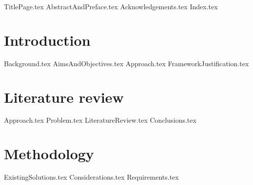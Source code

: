 \documentclass{article} %
\begin{document}

{TitlePage.tex}
{AbstractAndPreface.tex}
{Acknowledgements.tex}
{Index.tex}

\newpage
\section{Introduction}
{Background.tex}
{AimsAndObjectives.tex}
{Approach.tex}
{FrameworkJustification.tex}

\newpage
\section{Literature review}
{Approach.tex}
{Problem.tex}
{LiteratureReview.tex}
{Conclusions.tex}

\newpage
\section{Methodology}
{ExistingSolutions.tex}
{Considerations.tex}
{Requirements.tex}
\end{document}
